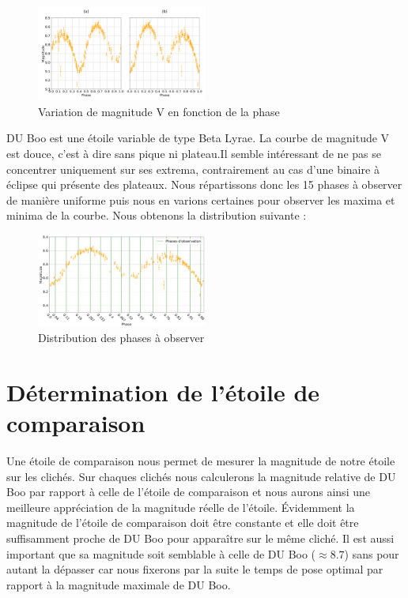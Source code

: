 \documentclass[10pt,french, openany]{book}
\begin{document}
\begin{figure}[h!]
    \centering
    \includegraphics[width=0.5\textwidth]{cds_luminosite_centree.png}
    \caption{Variation de magnitude V en fonction de la phase}
    \label{fig:my_label}
\end{figure}

DU Boo est une étoile variable de type Beta Lyrae. La courbe de magnitude V est douce, c'est à dire sans pique ni plateau.Il semble intéressant de ne pas se concentrer uniquement sur ses extrema, contrairement au cas d'une binaire à éclipse qui présente des plateaux. Nous répartissons donc les 15 phases à observer de manière uniforme puis nous en varions certaines pour observer les maxima et minima de la courbe. Nous obtenons la distribution suivante :

\begin{figure}[h!]
    \centering
    \includegraphics[width=0.5\textwidth]{Lumin+phase1.png}
    \caption{Distribution des phases à observer}
    \label{fig:my_label}
\end{figure}


\section{Détermination de l'étoile de comparaison}
    Une étoile de comparaison nous permet de mesurer la magnitude de notre étoile sur les clichés. Sur chaques clichés nous calculerons la magnitude relative de DU Boo par rapport à celle de l'étoile de comparaison et nous aurons ainsi une meilleure appréciation de la magnitude réelle de l'étoile. Évidemment la magnitude de l'étoile de comparaison doit être constante et elle doit être suffisamment proche de DU Boo pour apparaître sur le même cliché. Il est aussi important que sa magnitude soit semblable à celle de DU Boo ($\approx 8.7$) sans pour autant la dépasser car nous fixerons par la suite le temps de pose optimal par rapport à la magnitude maximale de DU Boo. 
    
\end{document}
